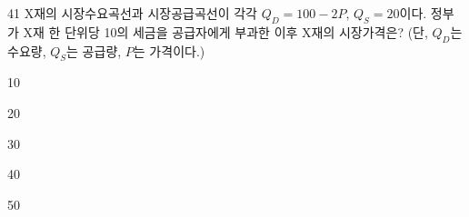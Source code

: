 \begin{question}{41}
X재의 시장수요곡선과 시장공급곡선이 각각 $Q_D = 100 - 2P$, $Q_S = 20$이다. 정부가 X재 한 단위당 10의 세금을 공급자에게 부과한 이후 X재의 시장가격은? (단, $Q_D$는 수요량, $Q_S$는 공급량, $P$는 가격이다.)
\begin{choices}
  \item 10
  \item 20
  \item 30
  \item 40
  \item 50
\end{choices}
\end{question}

